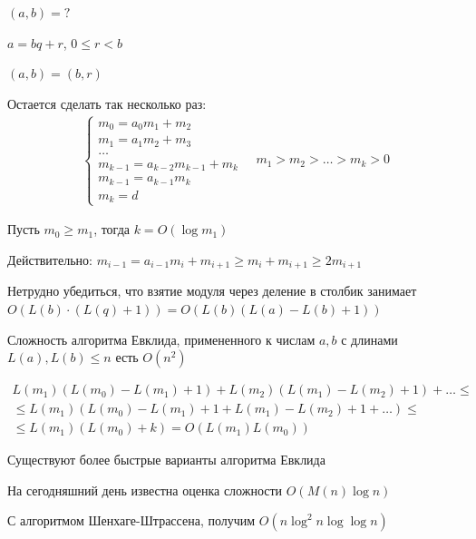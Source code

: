 \( (a, b) = ? \)

\( a = bq + r \), \( 0 \leq r < b \)

\( (a, b) = (b, r) \)

Остается сделать так несколько раз:
\begin{gather*}
    \begin{cases}
        m_0 = a_0 m_1 + m_2
        \\
        m_1 = a_1 m_2 + m_3
        \\
        \ldots
        \\
        m_{k - 1} = a_{k - 2} m_{k - 1} + m_k
        \\
        m_{k - 1} = a_{k - 1} m_k
        \\
        m_k = d
    \end{cases}
    \quad
    m_1 > m_2 > \ldots > m_k > 0
\end{gather*}

\begin{lemma}{}{}
    Пусть \( m_0 \geq m_1 \), тогда \( k = O(\log m_1) \)
\end{lemma}

Действительно: \( m_{i - 1} = a_{i - 1} m_i + m_{i + 1} \geq m_i + m_{i + 1} \geq 2 m_{i + 1} \)

Нетрудно убедиться, что взятие модуля через деление в столбик занимает \( O(L(b) \cdot (L(q) + 1)) = O(L(b) (L(a) - L(b) + 1)) \)

\begin{thrm}{}{}
    Сложность алгоритма Евклида, примененного к числам \( a, b \) с длинами \( L(a), L(b) \leq n \) есть \( O(n^2) \)
\end{thrm}
\begin{gather*}
    L(m_1) (L(m_0) - L(m_1) + 1) + L(m_2) (L(m_1) - L(m_2) + 1) + \ldots
    \leq
    \\
    \leq
    L(m_1) (L(m_0) - L(m_1) + 1 + L(m_1) - L(m_2) + 1 + \ldots)
    \leq
    \\
    \leq
    L(m_1) (L(m_0) + k)
    =
    O(L(m_1) L(m_0))
\end{gather*}

\begin{remark}{}{}
    Существуют более быстрые варианты алгоритма Евклида

    На сегодняшний день известна оценка сложности \( O(M(n) \log n) \)

    С алгоритмом Шенхаге-Штрассена, получим \( O(n \log^2 n \log \log n) \)
\end{remark}

